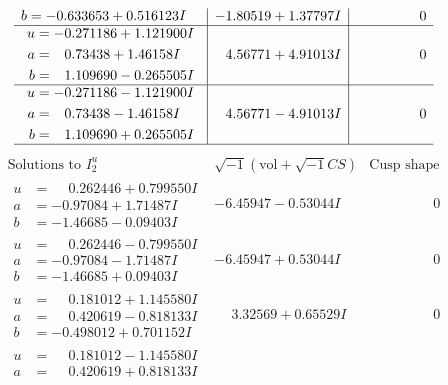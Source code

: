\documentclass[1p]{elsarticle_modified}
\theoremstyle{definition}
\newcommand{\I}{\sqrt{-1}}
\begin{document}
$$\begin{array}{c|c|c}
\begin{aligned}
b &= -0.633653 + 0.516123 I\end{aligned}
 & -1.80519 + 1.37797 I & \phantom{-0.000000 } 0 \\ \hline\begin{aligned}
u &= -0.271186 + 1.121900 I \\
a &= \phantom{-}0.73438 + 1.46158 I \\
b &= \phantom{-}1.109690 - 0.265505 I\end{aligned}
 & \phantom{-}4.56771 + 4.91013 I & \phantom{-0.000000 } 0 \\ \hline\begin{aligned}
u &= -0.271186 - 1.121900 I \\
a &= \phantom{-}0.73438 - 1.46158 I \\
b &= \phantom{-}1.109690 + 0.265505 I\end{aligned}
 & \phantom{-}4.56771 - 4.91013 I & \phantom{-0.000000 } 0\\
 \hline 
 \end{array}$$\newpage$$\begin{array}{c|c|c}  
\text{Solutions to }I^u_{2}& \I (\text{vol} + \sqrt{-1}CS) & \text{Cusp shape}\\
 \hline 
\begin{aligned}
u &= \phantom{-}0.262446 + 0.799550 I \\
a &= -0.97084 + 1.71487 I \\
b &= -1.46685 - 0.09403 I\end{aligned}
 & -6.45947 - 0.53044 I & \phantom{-0.000000 } 0 \\ \hline\begin{aligned}
u &= \phantom{-}0.262446 - 0.799550 I \\
a &= -0.97084 - 1.71487 I \\
b &= -1.46685 + 0.09403 I\end{aligned}
 & -6.45947 + 0.53044 I & \phantom{-0.000000 } 0 \\ \hline\begin{aligned}
u &= \phantom{-}0.181012 + 1.145580 I \\
a &= \phantom{-}0.420619 - 0.818133 I \\
b &= -0.498012 + 0.701152 I\end{aligned}
 & \phantom{-}3.32569 + 0.65529 I & \phantom{-0.000000 } 0 \\ \hline\begin{aligned}
u &= \phantom{-}0.181012 - 1.145580 I \\
a &= \phantom{-}0.420619 + 0.818133 I \\

\end{aligned}
\end{array}$$
\end{document}
